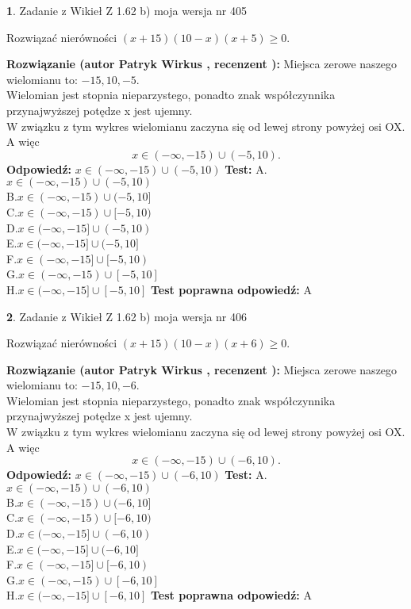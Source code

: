 \documentclass[12pt, a4paper]{article}
\theoremstyle{definition} %
\newtheorem{zad}{}
\newcommand{\zadStart}[1]{\begin{zad}#1\newline}
\newcommand{\zadStop}{\end{zad}}
\newcommand{\rozwStart}[2]{\noindent \textbf{Rozwiązanie (autor #1 , recenzent #2): }\newline}
\newcommand{\rozwStop}{\newline}
\newcommand{\odpStart}{\noindent \textbf{Odpowiedź:}\newline}
\newcommand{\odpStop}{\newline}
\newcommand{\testStart}{\noindent \textbf{Test:}\newline}
\newcommand{\testStop}{\newline}
\newcommand{\kluczStart}{\noindent \textbf{Test poprawna odpowiedź:}\newline}
\newcommand{\kluczStop}{\newline}
\begin{document}
\zadStart{Zadanie z Wikieł Z 1.62 b) moja wersja nr 405}

Rozwiązać nierówności $(x+15)(10-x)(x+5)\ge0$.
\zadStop
\rozwStart{Patryk Wirkus}{}
Miejsca zerowe naszego wielomianu to: $-15, 10, -5$.\\
Wielomian jest stopnia nieparzystego, ponadto znak współczynnika przy\linebreak najwyższej potędze x jest ujemny.\\ W związku z tym wykres wielomianu zaczyna się od lewej strony powyżej osi OX. A więc $$x \in (-\infty,-15) \cup (-5,10).$$
\rozwStop
\odpStart
$x \in (-\infty,-15) \cup (-5,10)$
\odpStop
\testStart
A.$x \in (-\infty,-15) \cup (-5,10)$\\
B.$x \in (-\infty,-15) \cup (-5,10]$\\
C.$x \in (-\infty,-15) \cup [-5,10)$\\
D.$x \in (-\infty,-15] \cup (-5,10)$\\
E.$x \in (-\infty,-15] \cup (-5,10]$\\
F.$x \in (-\infty,-15] \cup [-5,10)$\\
G.$x \in (-\infty,-15) \cup [-5,10]$\\
H.$x \in (-\infty,-15] \cup [-5,10]$
\testStop
\kluczStart
A
\kluczStop



\zadStart{Zadanie z Wikieł Z 1.62 b) moja wersja nr 406}

Rozwiązać nierówności $(x+15)(10-x)(x+6)\ge0$.
\zadStop
\rozwStart{Patryk Wirkus}{}
Miejsca zerowe naszego wielomianu to: $-15, 10, -6$.\\
Wielomian jest stopnia nieparzystego, ponadto znak współczynnika przy\linebreak najwyższej potędze x jest ujemny.\\ W związku z tym wykres wielomianu zaczyna się od lewej strony powyżej osi OX. A więc $$x \in (-\infty,-15) \cup (-6,10).$$
\rozwStop
\odpStart
$x \in (-\infty,-15) \cup (-6,10)$
\odpStop
\testStart
A.$x \in (-\infty,-15) \cup (-6,10)$\\
B.$x \in (-\infty,-15) \cup (-6,10]$\\
C.$x \in (-\infty,-15) \cup [-6,10)$\\
D.$x \in (-\infty,-15] \cup (-6,10)$\\
E.$x \in (-\infty,-15] \cup (-6,10]$\\
F.$x \in (-\infty,-15] \cup [-6,10)$\\
G.$x \in (-\infty,-15) \cup [-6,10]$\\
H.$x \in (-\infty,-15] \cup [-6,10]$
\testStop
\kluczStart
A
\kluczStop
\end{document}
